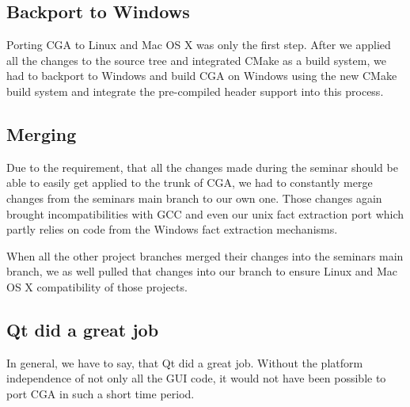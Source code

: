 \subsection{Backport to Windows}

Porting CGA to Linux and Mac OS X was only the first step. After we applied all the changes to the source tree and integrated CMake as a build system, we had to backport to Windows and build CGA on Windows using the new CMake build system  and integrate the pre-compiled header support into this process.

\subsection{Merging}

Due to the requirement, that all the changes made during the seminar should be able to easily get applied to the trunk of CGA, we had to constantly  merge changes from the seminars main branch to our own one. Those changes again brought incompatibilities with GCC and even our unix fact extraction port which partly relies on code from the Windows fact extraction mechanisms.

When all the other project branches merged their changes into the seminars main branch, we as well pulled that changes into our branch to ensure Linux and Mac OS X compatibility of those projects.

\subsection{Qt did a great job}


In general, we have to say, that Qt did a great job. Without the platform independence of not only all the GUI code, it would not have been possible to port CGA in such a short time period. 
